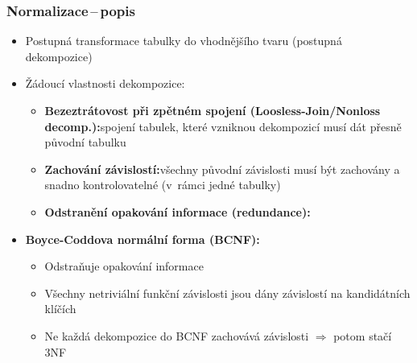 \documentclass[a4paper,10pt]{article}
\newcommand{\pojem}[2]{\item \textbf{#1:}\quad #2}
\newcommand{\tedy}{$\Rightarrow$ }
\begin{document}
      \subsubsection{Normalizace\,--\,popis}
        \begin{itemize}
          \item Postupná transformace tabulky do vhodnějšího tvaru (postupná dekompozice)
          \item Žádoucí vlastnosti dekompozice:
          \begin{itemize}
            \pojem{Bezeztrátovost při zpětném spojení (Loosless-Join/Nonloss decomp.)}{spojení tabulek, které vzniknou dekompozicí musí dát přesně původní tabulku}
            \pojem{Zachování závislostí}{všechny původní závislosti musí být zachovány a snadno kontrolovatelné (v~rámci jedné tabulky)}
            \pojem{Odstranění opakování informace (redundance)}
          \end{itemize}
          \pojem{Boyce-Coddova normální forma (BCNF)}
          \begin{itemize}
            \item Odstraňuje opakování informace
            \item Všechny netriviální funkční závislosti jsou dány závislostí na kandidátních klíčích
            \item Ne každá dekompozice do BCNF zachovává závislosti \tedy potom stačí 3NF
          \end{itemize}
        \end{itemize}
\end{document}
